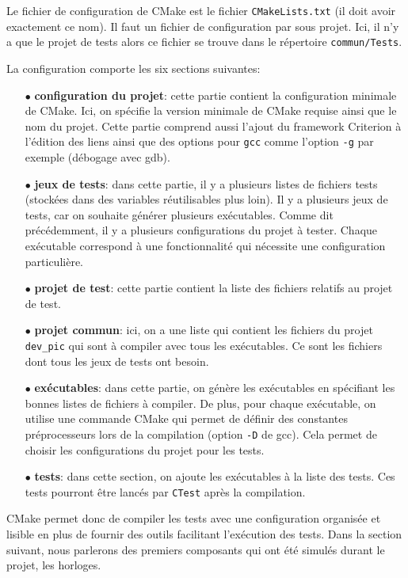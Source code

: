 \documentclass[a4paper]{article}
\begin{document}
Le fichier de configuration de CMake est le fichier \verb|CMakeLists.txt|
(il doit avoir exactement ce nom). Il faut un fichier de configuration par sous
projet. Ici, il n'y a que le projet de tests alors ce fichier se trouve dans le
répertoire \verb|commun/Tests|.

La configuration comporte les six sections suivantes:

\begin{itemize}
  \item[$\bullet$] \textbf{configuration du projet}: cette partie contient la
    configuration minimale de CMake. Ici, on spécifie la version minimale de
    CMake requise ainsi que le nom du projet. Cette partie comprend aussi
    l'ajout du framework Criterion à l'édition des liens ainsi que des options
    pour \verb|gcc| comme l'option \verb|-g| par exemple (débogage
    avec gdb).
  \item[$\bullet$] \textbf{jeux de tests}: dans cette partie, il y a plusieurs
    listes de fichiers tests (stockées dans des variables réutilisables plus
    loin). Il y a plusieurs jeux de tests, car on souhaite générer plusieurs
    exécutables. Comme dit précédemment, il y a plusieurs configurations du
    projet à tester. Chaque exécutable correspond à une fonctionnalité qui
    nécessite une configuration particulière.
  \item[$\bullet$] \textbf{projet de test}: cette partie contient la liste des
    fichiers relatifs au projet de test.
  \item[$\bullet$] \textbf{projet commun}: ici, on a une liste qui contient les
    fichiers du projet \verb|dev_pic| qui sont à compiler avec tous les
    exécutables. Ce sont les fichiers dont tous les jeux de tests ont besoin.
  \item[$\bullet$] \textbf{exécutables}: dans cette partie, on génère les
    exécutables en spécifiant les bonnes listes de fichiers à compiler. De plus,
    pour chaque exécutable, on utilise une commande CMake qui permet de définir
    des constantes préprocesseurs lors de la compilation (option \verb|-D|
    de gcc). Cela permet de choisir les configurations du projet pour les tests.
  \item[$\bullet$] \textbf{tests}: dans cette section, on ajoute les exécutables
    à la liste des tests. Ces tests pourront être lancés par \verb|CTest|
    après la compilation.
\end{itemize}

CMake permet donc de compiler les tests avec une configuration organisée et
lisible en plus de fournir des outils facilitant l'exécution des tests. Dans la
section suivant, nous parlerons des premiers composants qui ont été simulés
durant le projet, les horloges.
\end{document}
